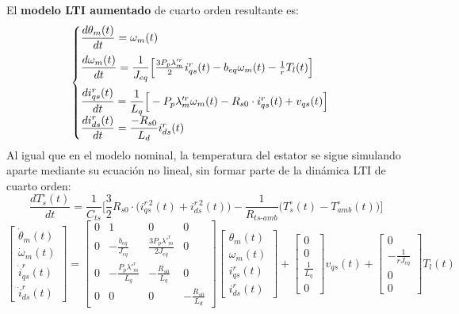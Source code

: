 \documentclass[12pt, a4paper,journal, onecolumn, compsoc]{IEEEtran}
\begin{document}
El \textbf{modelo LTI aumentado} de cuarto orden resultante es:
\begin{equation} \label{eq:sis_escalar_LTI_aug}
\begin{cases}
    \vspace{0.2cm}
    \dfrac{d\theta_m(t)}{dt} = \omega_m(t) \\
    \vspace{0.2cm}
    \dfrac{d\omega_m(t)}{dt} = \dfrac{1}{J_{eq}}\Big[\frac{3 P_p \lambda'^r_m}{2} i_{qs}^r(t) - b_{eq} \omega_m(t) - \frac{1}{r} T_l(t)\Big] \\
    \dfrac{di_{qs}^r(t)}{dt} = \dfrac{1}{L_q}\Big[-P_p \lambda'^r_m \omega_m(t) - R_{s0}\cdot i_{qs}^r(t) + v_{qs}(t)\Big] \\
    \dfrac{di_{ds}^r(t)}{dt} = \dfrac{-R_{s0}}{L_d}i_{ds}^r(t)
\end{cases}
\end{equation}
Al igual que en el modelo nominal, la temperatura del estator se sigue simulando aparte mediante su ecuación no lineal, sin formar parte de la dinámica LTI de cuarto orden:
\[\dfrac{dT_s^\circ(t)}{dt} = \dfrac{1}{C_{ts}}\Big[\frac{3}{2}R_{s0}\cdot \big(i_{qs}^{r\,2}(t)+i_{ds}^{r\,2}(t)\big)-\frac{1}{R_{ts\text{-}amb}}\big(T_s^\circ(t) - T_{amb}^\circ(t)\big)\Big]\]
\begingroup
\renewcommand{\arraystretch}{1.8} 
\footnotesize\begin{equation}
\begin{bmatrix}
\dot{\theta}_m (t)\\
\dot{\omega}_m(t)\\
\dot{i}_{qs}^r(t)\\
\dot{i}_{ds}^r(t)
\end{bmatrix}
= 
\begin{bmatrix}
0 & 1 & 0 & 0 \\
0  & -\frac{b_{eq}}{J_{eq}} & \frac{3 P_p \lambda'^r_m}{2 J_{eq}} & 0 \\
 0 &  -\frac{P_p \lambda'^r_m}{L_q} & -\frac{R_{s0}}{L_q} & 0 \\
 0 & 0 & 0 & -\frac{R_{s0}}{L_d}
\end{bmatrix}
\begin{bmatrix}
\theta_m(t) \\
\omega_m (t)\\
i_{qs}^r(t) \\
i_{ds}^r(t)
\end{bmatrix}
+
\begin{bmatrix}
0  \\
0  \\
\frac{1}{L_q} \\
0
\end{bmatrix}
v_{qs}(t) 
+
\begin{bmatrix}
0 \\
-\frac{1}{rJ_{eq}} \\
0 \\
0
\end{bmatrix}
T_l(t)
\end{equation}\normalsize
\endgroup
\end{document}
